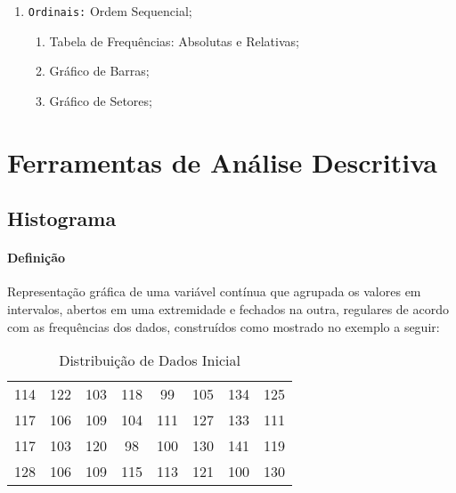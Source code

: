 \documentclass{article}
\begin{document}
\begin{enumerate}[noitemsep]
\begin{enumerate}[noitemsep]
                            \item \texttt{Ordinais:} Ordem Sequencial;
                                \begin{enumerate}[noitemsep]
                                    \item Tabela de Frequências: Absolutas e Relativas;
                                    \item Gráfico de Barras;
                                    \item Gráfico de Setores;
                                \end{enumerate}
                        \end{enumerate}
                \end{enumerate}
\newpage

    \section{Ferramentas de Análise Descritiva}
        \subsection{Histograma}
            \paragraph{Definição}Representação gráfica de uma variável contínua que agrupada os valores em intervalos, abertos em uma extremidade e fechados na outra, regulares de acordo com as frequências dos dados, construídos como mostrado no exemplo a seguir:

                \begin{table}[H]
                    \centering
                    \begin{tabular}[]{cccccccc}\hline
                        114 & 122 & 103 & 118 &  99 & 105 & 134 & 125\\
                        117 & 106 & 109 & 104 & 111 & 127 & 133 & 111\\
                        117 & 103 & 120 &  98 & 100 & 130 & 141 & 119\\
                        128 & 106 & 109 & 115 & 113 & 121 & 100 & 130\\\hline
                    \end{tabular}
                    \caption{Distribuição de Dados Inicial}\label{table:data}
                \end{table}
\end{document}
